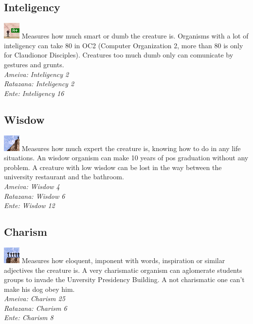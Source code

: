 \documentclass[ letterpaper,12pt]{article}
\begin{document}
\subsection{Inteligency}
\includegraphics{../data/skills/Img/inteligencia.png}
Measures how much smart or dumb the creature is. Organisms with a lot of inteligency can take 80 in OC2 (Computer Organization 2, more than 80 is only for Claudionor Disciples). Creatures too much dumb only can comunicate by gestures and grunts.\\
{\it Ameiva: Inteligency 2\\
Ratazana: Inteligency 2\\
Ente: Inteligency 16\\}

\subsection{Wisdow}
\includegraphics{../data/skills/Img/sabedoria.png}
Measures how much expert the creature is, knowing how to do in any life situations. An wisdow organism can make 10 years of pos graduation without any problem. A creature with low wisdow can be lost in the way between the university restaurant and the bathroom.\\
{\it Ameiva: Wisdow 4\\
Ratazana: Wisdow 6\\
Ente: Wisdow 12}

\subsection{Charism}
\includegraphics{../data/skills/Img/carisma.png}
Measures how eloquent, imponent with words, inspiration or similar adjectives the creature is. A very charismatic organism can aglomerate students groups to invade the Unversity Presidency Building. A not charismatic one can't make his dog obey him.\\
{\it Ameiva: Charism 25\\
Ratazana: Charism 6\\
Ente: Charism 8}
\end{document}
